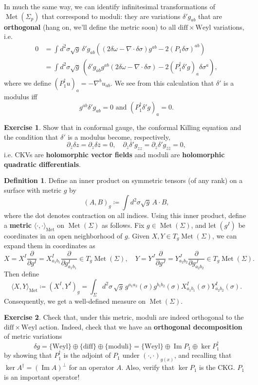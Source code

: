 \documentclass{report}
\theoremstyle{plain}
\theoremstyle{definition}
\newtheorem{definition}[theorem]{Definition}
\newtheorem{exercise}{Exercise}[section]
\theoremstyle{remark}
\newcommand{\di}{\partial}
\newcommand{\diff}{\mathrm{diff}}
\newcommand{\Weyl}{\mathrm{Weyl}}
\DeclareMathOperator{\im}{Im}
\DeclareMathOperator{\Met}{Met}
\newcommand{\pder}[2]{\frac{\partial #1}{\partial #2}}
\newcommand{\bz}{\bar{z}}
\begin{document}
In much the same way, we can identify infinitesimal transformations of
$\Met(\Sigma_p)$ that correspond to moduli: they are variations
$\delta' g_{ab}$ that are {\bf orthogonal} (hang on, we'll define the
metric soon) to all $\diff \times \Weyl$ variations, i.e.
\begin{align*}
  0
  &= \int d^2\sigma \sqrt{g} \, \delta' g_{ab} \left((2\delta \omega - \nabla \cdot \delta \sigma) g^{ab} - 2(P_1 \delta \sigma)^{ab}\right) \\
  &= \int d^2\sigma \sqrt{g} \, \left(\delta' g_{ab} g^{ab}(2\delta \omega - \nabla \cdot \delta \sigma) - 2(P_1^\dag \delta' g)_a \delta \sigma^a\right),
\end{align*}
where we define $(P_1^\dag u)_a = -\nabla^b u_{ab}$. We see from this
calculation that $\delta'$ is a modulus iff
\[ g^{ab}\delta' g_{ab} = 0 \text{ and } (P_1^\dag \delta' g)_a = 0. \]

\begin{exercise}
  Show that in conformal gauge, the conformal Killing equation and the
  condition that $\delta'$ is a modulus become, respectively,
  \[ \di_{\bz} \delta z = \di_z \delta \bz = 0, \quad \di_{\bz} \delta' g_{zz} = \di_z \delta' g_{\bz\bz} = 0, \]
  i.e. CKVs are {\bf holomorphic vector fields} and moduli are {\bf
    holomorphic quadratic differentials}.
\end{exercise}

\begin{definition}
  Define an inner product on symmetric tensors (of any rank) on a
  surface with metric $g$ by
  \[ (A, B)_g \coloneqq \int d^2\sigma \sqrt{g} \, A \cdot B, \]
  where the dot denotes contraction on all indices. Using this inner
  product, define a {\bf metric} $\langle \cdot, \cdot \rangle_{\Met}$
  on $\Met(\Sigma)$ as follows. Fix $g \in \Met(\Sigma)$, and let
  $(g^I)$ be coordinates in an open neighborhood of $g$. Given $X, Y
  \in T_g\Met(\Sigma)$, we can expand them in coordinates as
  \[ X = X^I \pder{}{g^I} = X^I_{a_1b_1} \pder{}{g^I_{a_1b_1}} \in T_g\Met(\Sigma), \quad Y = Y^J \pder{}{g^J} = Y^J_{a_2b_2} \pder{}{g^J_{a_2b_2}} \in T_g\Met(\Sigma). \]
  Then define
  \[ \langle X, Y \rangle_{\Met} \coloneqq (X^I, Y^I)_g = \int_\Sigma d^2\sigma \, \sqrt{g} \, g^{a_1a_2}(\sigma) g^{b_1b_2}(\sigma) X^I_{a_1b_1}(\sigma) Y^I_{a_2b_2}(\sigma). \] 
  Consequently, we get a well-defined measure on $\Met(\Sigma)$.
\end{definition}

\begin{exercise}
  Check that, under this metric, moduli are indeed orthogonal to the
  $\diff \times \Weyl$ action. Indeed, check that we have an {\bf
    orthogonal decomposition} of metric variations
  \[ \delta g = \{\Weyl\} \oplus \{\diff\} \oplus \{\text{moduli}\} = \{\Weyl\} \oplus \im P_1 \oplus \ker P_1^\dag \]
  by showing that $P_1^\dag$ is the adjoint of $P_1$ under $(\cdot,
  \cdot)_{g(x)}$, and recalling that $\ker A^\dag = (\im A)^\perp$ for
  an operator $A$. Also, verify that $\ker P_1$ is the CKG. $P_1$ is
  an important operator!
\end{exercise}
\end{document}
